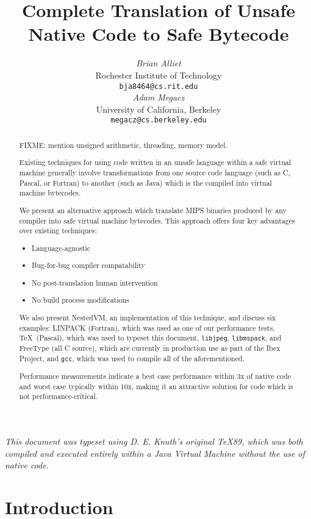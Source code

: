 \documentclass{acmconf}
\title{\textbf{\textsf{
Complete Translation of Unsafe Native Code to Safe Bytecode
}}}
\date{}
\author{\begin{tabular}{@{}c@{}}
        {\em {Brian Alliet}} \\
        {Rochester Institute of Technology}\\
        {\tt bja8464@cs.rit.edu}
   \end{tabular}\hskip 1in\begin{tabular}{@{}c@{}}
        {\em {Adam Megacz}} \\
        {University of California, Berkeley} \\
        {\tt megacz@cs.berkeley.edu}
\end{tabular}}
\begin{document}
\maketitle

{\it This document was typeset using D. E. Knuth's original \TeX 89,
     which was both compiled and executed entirely within a Java
     Virtual Machine without the use of native code.}

\begin{abstract}

FIXME: mention unsigned arithmetic, threading, memory model.

Existing techniques for using code written in an unsafe language
within a safe virtual machine generally involve transformations from
one source code language (such as C, Pascal, or Fortran) to another
(such as Java) which is the compiled into virtual machine bytecodes.

We present an alternative approach which translate MIPS binaries
produced by any compiler into safe virtual machine bytecodes.  This
approach offers four key advantages over existing techniques:

\begin{itemize}
\item Language-agnostic
\item Bug-for-bug compiler compatability
\item No post-translation human intervention
\item No build process modifications
\end{itemize}

We also present NestedVM, an implementation of this technique, and
discuss six examples: LINPACK (Fortran), which was used as one of our
performance tests, \TeX\ (Pascal), which was used to typeset this
document, {\tt libjpeg}, {\tt libmspack}, and FreeType (all C source),
which are currently in production use as part of the Ibex Project, and
{\tt gcc}, which was used to compile all of the aforementioned.

Performance measurements indicate a best case performance within 3x of
native code and worst case typically within 10x, making it an
attractive solution for code which is not performance-critical.

\end{abstract}

\section{Introduction}
\end{document}
